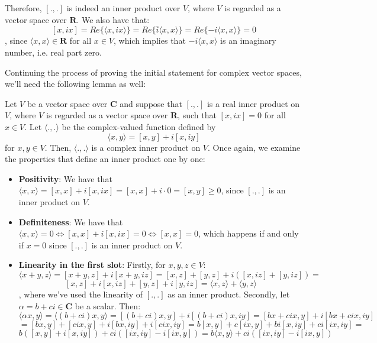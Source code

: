 \begin{solution}
\begin{itemize}
    Therefore, $[., .]$ is indeed an inner product over $V$, where $V$ is regarded as a vector space over $\mathbf{R}$. We also have that:
    $$[x, ix] = Re\{\langle x, ix \rangle\} = Re\{ \overline{i}\langle x, x \rangle\} = Re\{ -i \langle x, x \rangle \} = 0$$
    , since $\langle x, x\rangle \in \mathbf{R}$ for all $x \in V$, which implies that $-i\langle x, x\rangle$ is an imaginary number, i.e. real part zero.
\end{itemize}

Continuing the process of proving the initial statement for complex vector spaces, we'll need the following lemma as well:

Let $V$ be a vector space over $\mathbf{C}$ and suppose that $[., .]$ is a real inner product on $V$, where $V$ is regarded as a vector space over $\mathbf{R}$, such that $[x, ix] = 0$ for all $x \in V$. Let $\langle ., . \rangle$ be the complex-valued function defined by
$$\langle x, y \rangle = [x, y] + i[x, iy]$$ for $x, y \in V$.
Then, $\langle ., . \rangle$ is a complex inner product on $V$.
Once again, we examine the properties that define an inner product one by one:
\begin{itemize}
    \item \textbf{Positivity}: We have that $\langle x, x \rangle = [x, x] + i[x, ix] = [x, x] + i\cdot0 = [x, y] \geq 0$, since $[., .]$ is an inner product on $V$.
    \item \textbf{Definiteness}: We have that $\langle x, x \rangle = 0 \iff [x, x] + i[x, ix] = 0 \iff [x, x] = 0$, which happens if and only if $x = 0$ since $[., .]$ is an inner product on $V$.
    \item \textbf{Linearity in the first slot}: Firstly, for $x, y, z \in V$:
    $$\langle x + y, z \rangle = [x + y, z] + i[x + y, iz] = [x, z] + [y, z] + i([x, iz] + [y, iz]) = $$
    $$[x, z] + i[x, iz] + [y, z] + i[y, iz] = \langle x, z\rangle + \langle y, z \rangle$$, where we've used the linearity of $[., .]$ as an inner product.
    Secondly, let $\alpha = b + ci \in \mathbf{C}$ be a scalar. Then:
    $$\langle \alpha x, y \rangle = \langle (b + ci)x, y \rangle = [(b + ci)x, y] + i[(b + ci)x, iy] = [bx + cix, y] + i[bx + cix, iy]$$
    $$= [bx, y] + [cix, y] + i[bx, iy] + i[cix, iy] = b[x, y] + c[ix, y] + bi[x, iy] + ci[ix, iy] = $$
    $$b([x, y] + i[x, iy]) + ci([ix, iy] - i[ix, y]) = b\langle x, y \rangle + ci([ix, iy] - i[ix, y])$$


\end{itemize}
\end{solution}

